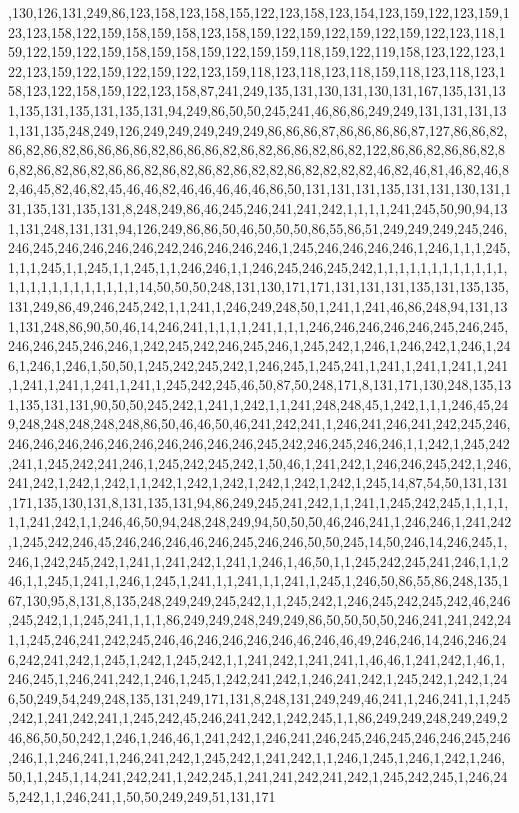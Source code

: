 ,130,126,131,249,86,123,158,123,158,155,122,123,158,123,154,123,159,122,123,159,123,123,158,122,159,158,159,158,123,158,159,122,159,122,159,122,159,122,123,118,159,122,159,122,159,158,159,158,159,122,159,159,118,159,122,119,158,123,122,123,122,123,159,122,159,122,159,122,123,159,118,123,118,123,118,159,118,123,118,123,158,123,122,158,159,122,123,158,87,241,249,135,131,130,131,130,131,167,135,131,131,135,131,135,131,135,131,94,249,86,50,50,245,241,46,86,86,249,249,131,131,131,131,131,135,248,249,126,249,249,249,249,249,86,86,86,87,86,86,86,86,87,127,86,86,82,86,82,86,82,86,86,86,86,82,86,86,86,82,86,82,86,86,82,86,82,122,86,86,82,86,86,82,86,82,86,82,86,82,86,86,82,86,82,86,82,86,82,82,86,82,82,82,82,46,82,46,81,46,82,46,82,46,45,82,46,82,45,46,46,82,46,46,46,46,46,86,50,131,131,131,135,131,131,130,131,131,135,131,135,131,8,248,249,86,46,245,246,241,241,242,1,1,1,1,241,245,50,90,94,131,131,248,131,131,94,126,249,86,86,50,46,50,50,50,86,55,86,51,249,249,249,245,246,246,245,246,246,246,246,242,246,246,246,246,1,245,246,246,246,246,1,246,1,1,1,245,1,1,1,245,1,1,245,1,1,245,1,1,246,246,1,1,246,245,246,245,242,1,1,1,1,1,1,1,1,1,1,1,1,1,1,1,1,1,1,1,1,1,1,1,1,14,50,50,50,248,131,130,171,171,131,131,131,135,131,135,135,131,249,86,49,246,245,242,1,1,241,1,246,249,248,50,1,241,1,241,46,86,248,94,131,131,131,248,86,90,50,46,14,246,241,1,1,1,1,241,1,1,1,246,246,246,246,246,245,246,245,246,246,245,246,246,1,242,245,242,246,245,246,1,245,242,1,246,1,246,242,1,246,1,246,1,246,1,246,1,50,50,1,245,242,245,242,1,246,245,1,245,241,1,241,1,241,1,241,1,241,1,241,1,241,1,241,1,241,1,245,242,245,46,50,87,50,248,171,8,131,171,130,248,135,131,135,131,131,90,50,50,245,242,1,241,1,242,1,1,241,248,248,45,1,242,1,1,1,246,45,249,248,248,248,248,248,86,50,46,46,50,46,241,242,241,1,246,241,246,241,242,245,246,246,246,246,246,246,246,246,246,246,246,245,242,246,245,246,246,1,1,242,1,245,242,241,1,245,242,241,246,1,245,242,245,242,1,50,46,1,241,242,1,246,246,245,242,1,246,241,242,1,242,1,242,1,1,242,1,242,1,242,1,242,1,242,1,242,1,245,14,87,54,50,131,131,171,135,130,131,8,131,135,131,94,86,249,245,241,242,1,1,241,1,245,242,245,1,1,1,1,1,1,241,242,1,1,246,46,50,94,248,248,249,94,50,50,50,46,246,241,1,246,246,1,241,242,1,245,242,246,45,246,246,246,46,246,245,246,246,50,50,245,14,50,246,14,246,245,1,246,1,242,245,242,1,241,1,241,242,1,241,1,246,1,46,50,1,1,245,242,245,241,246,1,1,246,1,1,245,1,241,1,246,1,245,1,241,1,1,241,1,1,241,1,245,1,246,50,86,55,86,248,135,167,130,95,8,131,8,135,248,249,249,245,242,1,1,245,242,1,246,245,242,245,242,46,246,245,242,1,1,245,241,1,1,1,86,249,249,248,249,249,86,50,50,50,50,246,241,241,242,241,1,245,246,241,242,245,246,46,246,246,246,246,46,246,46,49,246,246,14,246,246,246,242,241,242,1,245,1,242,1,245,242,1,1,241,242,1,241,241,1,46,46,1,241,242,1,46,1,246,245,1,246,241,242,1,246,1,245,1,242,241,242,1,246,241,242,1,245,242,1,242,1,246,50,249,54,249,248,135,131,249,171,131,8,248,131,249,249,46,241,1,246,241,1,1,245,242,1,241,242,241,1,245,242,45,246,241,242,1,242,245,1,1,86,249,249,248,249,249,246,86,50,50,242,1,246,1,246,46,1,241,242,1,246,241,246,245,246,245,246,246,245,246,246,1,1,246,241,1,246,241,242,1,245,242,1,241,242,1,1,246,1,245,1,246,1,242,1,246,50,1,1,245,1,14,241,242,241,1,242,245,1,241,241,242,241,242,1,245,242,245,1,246,245,242,1,1,246,241,1,50,50,249,249,51,131,171